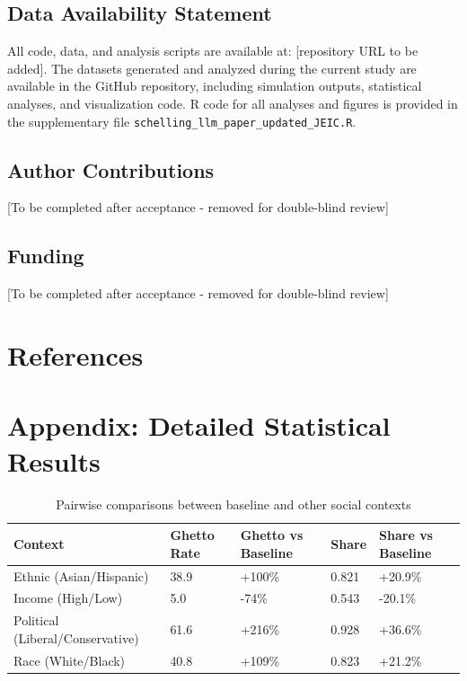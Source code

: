\documentclass[pdflatex,sn-basic]{sn-jnl}%
\begin{document}
\subsection*{Data Availability Statement}
All code, data, and analysis scripts are available at: [repository URL to be added]. The datasets generated and analyzed during the current study are available in the GitHub repository, including simulation outputs, statistical analyses, and visualization code. R code for all analyses and figures is provided in the supplementary file \texttt{schelling\_llm\_paper\_updated\_JEIC.R}.

\subsection*{Author Contributions}
[To be completed after acceptance - removed for double-blind review]

\subsection*{Funding}
[To be completed after acceptance - removed for double-blind review]

\section*{References}


\section*{Appendix: Detailed Statistical
Results}\label{appendix-detailed-statistical-results}


\begin{table}[ht]
\caption{Pairwise comparisons between baseline and other social contexts}
\centering
\begin{tabular}{lllll}
\hline
Context & Ghetto Rate & Ghetto vs Baseline & Share & Share vs Baseline\\
\hline
Ethnic (Asian/Hispanic) & 38.9 & +100\% & 0.821 & +20.9\%\\
Income (High/Low) & 5.0 & -74\% & 0.543 & -20.1\%\\
Political (Liberal/Conservative) & 61.6 & +216\% & 0.928 & +36.6\%\\
Race (White/Black) & 40.8 & +109\% & 0.823 & +21.2\%\\
\hline
\end{tabular}
\end{table}
\end{document}

